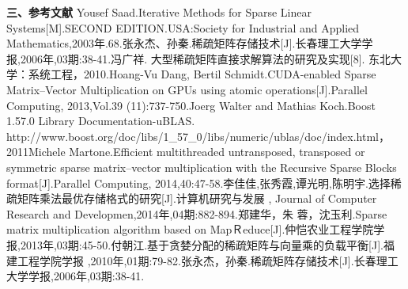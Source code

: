 \documentclass{article}
\begin{document}
\textbf{三、参考文献}
      \qquad
\newline
 [1]Yousef Saad.Iterative Methods for Sparse Linear Systems[M].SECOND EDITION.USA:Society for Industrial and Applied Mathematics,2003年.68.\newline
 [2]张永杰、孙秦.稀疏矩阵存储技术[J].长春理工大学学报,2006年,03期:38-41.\newline
 [3]冯广祥. 大型稀疏矩阵直接求解算法的研究及实现[8].  东北大学：系统工程，2010.\newline
    [4]Hoang-Vu Dang,  Bertil Schmidt.CUDA-enabled Sparse Matrix–Vector Multiplication on GPUs
using atomic operations[J].Parallel Computing, 2013,Vol.39 (11):737-750.\newline
 [5]Joerg Walter and Mathias Koch.Boost 1.57.0 Library Documentation-uBLAS. http://www.boost.org/doc/libs/1\_57\_0/libs/numeric/ublas/doc/index.html， 2011\newline
  [6]Michele Martone.Efficient multithreaded untransposed, transposed or symmetric sparse matrix–vector multiplication with the Recursive Sparse Blocks format[J].Parallel Computing, 2014,40:47-58.\newline
  [7]李佳佳,张秀霞,谭光明,陈明宇.选择稀疏矩阵乘法最优存储格式的研究[J].计算机研究与发展 , Journal of Computer Research and Developmen,2014年,04期:882-894.\newline
  [8]郑建华，朱 蓉，沈玉利.Sparse matrix multiplication algorithm based on MapＲeduce[J].仲恺农业工程学院学报,2013年,03期:45-50.\newline
[9]付朝江.基于贪婪分配的稀疏矩阵与向量乘的负载平衡[J].福建工程学院学报 ,2010年,01期:79-82.\newline
[10]张永杰，孙秦.稀疏矩阵存储技术[J].长春理工大学学报,2006年,03期:38-41.\newline
 
\end{document}
